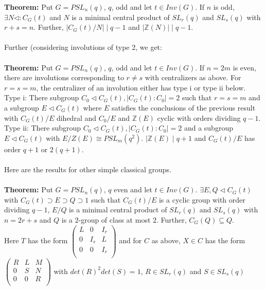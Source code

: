 {\bf Theorem:} Put $G = PSL_n(q)$, $q$, odd  and let $t \in Inv(G)$. If $n$ is odd, $\exists N \lhd: C_G(t)$ and $N$ is a
minimal central product of $SL_r(q)$ and $SL_s(q)$ with $r+s=n$.  Further, $|C_G(t)/N| \mid q-1$ and $|\mathbb{Z}(N)| \mid q-1$.
\\
\\
Further (considering involutions of type 2, we get:
\\
\\
{\bf Theorem:} Put $G = PSL_n(q)$, $q$, odd  and let $t \in Inv(G)$. If $n=2m$ is even, there are involutions corresponding to $r \neq s$ with
centralizers as above.  For $r=s=m$, the centralizer of an involution either has type i or type ii below.  Type i:
There subgroup $C_0 \lhd C_G(t), |C_G(t):C_0| =2$ such that $r=s=m$ and a subgroup $E \lhd C_G(t)$ where $E$ satisfies the conclusions
of the previous result with $C_G(t)/E$ dihedral and
$C_0/E$ and $\mathbb{Z}(E)$ cyclic with orders dividing $q-1$.  Type ii:  There subgroup $C_0 \lhd C_G(t), |C_G(t):C_0| =2$ and a subgroup $E \lhd C_G(t)$ 
with $E/Z(E) \cong PSL_m(q^2)$. $|\mathbb{Z}(E) \mid q+1$ and $C_G(t) /E$ has order $q+1$ or $2(q+1)$.
\\
\\
Here are the results for other simple classical groups.
\\
\\
{\bf Theorem:} Put $G = PSL_n(q)$, $q$ even and let $t \in Inv(G)$. $\exists E, Q \lhd C_G(t)$ with
$C_G(t) \supset E \supset Q \supset 1$ such that $C_G(t)/E$ is a cyclic group with order dividing $q-1$,
$E/Q$ is a minimal central product of $SL_r(q)$ and $SL_s(q)$ with $n=2r+s$ and $Q$ is a $2$-group of class at
most $2$.  Further, $C_G(Q) \subseteq Q$.\\
Here $T$ has the form $\left(
\begin{array}{ccc}
L &  0 & I_r \\
0 & I_s  & L \\
0 & 0  & I_r \\
\end{array}
\right)$ and for $C$ as above, $X \in C$ has the form
$\left(
\begin{array}{ccc}
R &  L & M \\
0 & S  & N \\
0 & 0  & R \\
\end{array}
\right)$ with $det(R)^2 det(S) = 1$, $R \in SL_r(q)$ and $S \in SL_s(q)$
\\
\\
